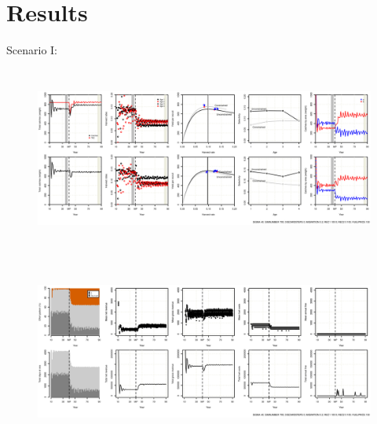 \documentclass[12pt,oneline,a4paper,numbib]{ouparticle}
\begin{document}
\section{Results}
\label{sec3}


\newpage
\begin{landscape}
Scenario I:
\begin{figure}[!h]
\centering
\includegraphics[width=\textheight,height=6cm]{Figures/Catch_LO.eps} 
\caption{}
\label{fig:catch_lo}
\end{figure}

\begin{figure}[!h]
\centering
\includegraphics[width=\textheight,height=6cm]{Figures/Effort_LO.eps} 
\caption{}
\label{fig:effort_lo}
\end{figure}
\end{landscape}
\end{document}
